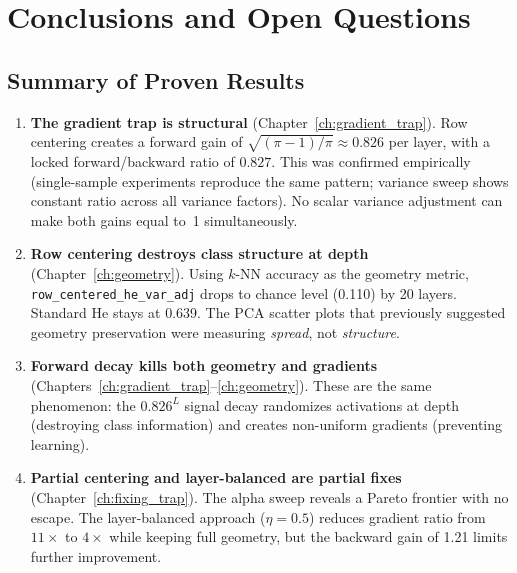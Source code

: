\chapter{Conclusions and Open Questions}
\label{ch:conclusions}

\section{Summary of Proven Results}

\begin{enumerate}
  \item \textbf{The gradient trap is structural}
        (Chapter~\ref{ch:gradient_trap}).
        Row centering creates a forward gain of
        $\sqrt{(\pi-1)/\pi} \approx 0.826$ per layer, with a locked
        forward/backward ratio of $0.827$.  This was confirmed
        empirically (single-sample experiments reproduce the same
        pattern; variance sweep shows constant ratio across all
        variance factors).  No scalar variance adjustment can make
        both gains equal to~1 simultaneously.

  \item \textbf{Row centering destroys class structure at depth}
        (Chapter~\ref{ch:geometry}).
        Using $k$-NN accuracy as the geometry metric,
        \texttt{row\_centered\_he\_var\_adj} drops to chance level
        (0.110) by 20 layers.  Standard He stays at 0.639.
        The PCA scatter plots that previously suggested geometry
        preservation were measuring \emph{spread}, not
        \emph{structure}.

  \item \textbf{Forward decay kills both geometry and gradients}
        (Chapters~\ref{ch:gradient_trap}--\ref{ch:geometry}).
        These are the same phenomenon: the $0.826^L$ signal decay
        randomizes activations at depth (destroying class
        information) and creates non-uniform gradients (preventing
        learning).

  \item \textbf{Partial centering and layer-balanced are partial fixes}
        (Chapter~\ref{ch:fixing_trap}).
        The alpha sweep reveals a Pareto frontier with no escape.
        The layer-balanced approach ($\eta = 0.5$) reduces gradient
        ratio from $11\times$ to $4\times$ while keeping full geometry,
        but the backward gain of 1.21 limits further improvement.


\end{enumerate}
